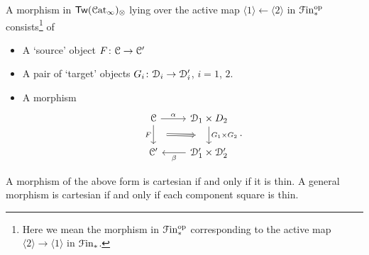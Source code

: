 \documentclass[main.tex]{subfiles}
\begin{document}
\begin{example}
  A morphism in $\mathsf{Tw}(\mathcal{C}\mathrm{at}_{\infty})_{\otimes}$ lying over the active map $\langle 1 \rangle \leftarrow \langle 2 \rangle$ in $\mathcal{F}\mathrm{in}_{*}^{\mathrm{op}}$ consists\footnote{Here we mean the morphism in $\mathcal{F}\mathrm{in}_{*}^{\mathrm{op}}$ corresponding to the active map $\langle 2 \rangle \to \langle 1 \rangle$ in $\mathcal{F}\mathrm{in}_{*}$.} of
  \begin{itemize}
    \item A `source' object $F\colon \mathcal{C} \to \mathcal{C}'$

    \item A pair of `target' objects $G_{i}\colon \mathcal{D}_{i} \to \mathcal{D}'_{i}$, $i = 1$, $2$.

    \item A morphism
      \begin{equation*}
        \begin{tikzcd}
          \category{C}
          \arrow[r, "\alpha"]
          \arrow[d, ""{name=L, right}, "F"{left}]
          & \category{D}_{1} \times D_{2}
          \arrow[d, ""{name=R, left}, "G_{1} \times G_{2}"{right}]
          \\
          \category{C}'
          & \category{D}'_{1} \times \category{D}'_{2}
          \arrow[l, "\beta"]
          \arrow[Rightarrow, from=L, to=R, shorten=2ex]
        \end{tikzcd}.
      \end{equation*}
  \end{itemize}

  A morphism of the above form is cartesian if and only if it is thin. A general morphism is cartesian if and only if each component square is thin.
\end{example}
\end{document}
